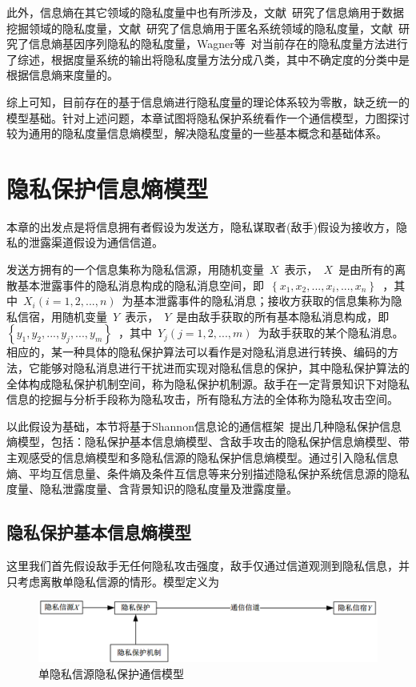 此外，信息熵在其它领域的隐私度量中也有所涉及，文献~\cite{agrawal2001design,zhan2007quantifying}研究了信息熵用于数据挖掘领域的隐私度量，文献~\cite{edman2007combinatorial}研究了信息熵用于匿名系统领域的隐私度量，文献~\cite{wagner2017evaluating}研究了信息熵基因序列隐私的隐私度量，Wagner等~\cite{wagner2018technical}对当前存在的隐私度量方法进行了综述，根据度量系统的输出将隐私度量方法分成八类，其中不确定度的分类中是根据信息熵来度量的。

综上可知，目前存在的基于信息熵进行隐私度量的理论体系较为零散，缺乏统一的模型基础。针对上述问题，本章试图将隐私保护系统看作一个通信模型，力图探讨较为通用的隐私度量信息熵模型，解决隐私度量的一些基本概念和基础体系。

\section{隐私保护信息熵模型}\label{sec:Entropy model of privacy protection information}

本章的出发点是将信息拥有者假设为发送方，隐私谋取者(敌手)假设为接收方，隐私的泄露渠道假设为通信信道。

发送方拥有的一个信息集称为隐私信源，用随机变量~$X$~表示，~$X$~是由所有的离散基本泄露事件的隐私消息构成的隐私消息空间，即~$\left \{ x_{1},x_{2},...,x_{i},...,x_{n} \right \}$~，其中~$X_{i}(i=1,2,...,n)$~为基本泄露事件的隐私消息；接收方获取的信息集称为隐私信宿，用随机变量~$Y$~表示，~$Y$~是由敌手获取的所有基本隐私消息构成，即~$\left \{y_{1},y_{2},...,y_{j},...,y_{m} \right \}$~，其中~$Y_{j}(j=1,2,...,m)$~为敌手获取的某个隐私消息。相应的，某一种具体的隐私保护算法可以看作是对隐私消息进行转换、编码的方法，它能够对隐私消息进行干扰进而实现对隐私信息的保护，其中隐私保护算法的全体构成隐私保护机制空间，称为隐私保护机制源。敌手在一定背景知识下对隐私信息的挖掘与分析手段称为隐私攻击，所有隐私方法的全体称为隐私攻击空间。

以此假设为基础，本节将基于Shannon信息论的通信框架~\cite{stone2018information}提出几种隐私保护信息熵模型，包括：隐私保护基本信息熵模型、含敌手攻击的隐私保护信息熵模型、带主观感受的信息熵模型和多隐私信源的隐私保护信息熵模型。通过引入隐私信息熵、平均互信息量、条件熵及条件互信息等来分别描述隐私保护系统信息源的隐私度量、隐私泄露度量、含背景知识的隐私度量及泄露度量。

\subsection{隐私保护基本信息熵模型}

这里我们首先假设敌手无任何隐私攻击强度，敌手仅通过信道观测到隐私信息，并只考虑离散单隐私信源的情形。模型定义为
\begin{figure}[htbp]
	\centering
	\includegraphics[width = 0.95\linewidth]{./figures/Communication-Model-for-Privacy.png}
	\caption{单隐私信源隐私保护通信模型}
	\label{fig:communication-model-privacy}
\end{figure}


